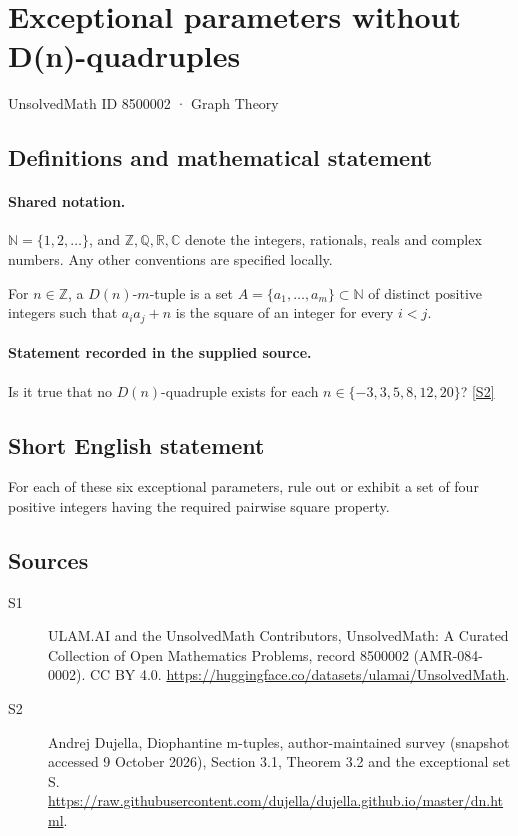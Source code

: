 \documentclass[11pt]{article}
\newcommand{\sref}[2]{\hyperlink{source:#1:#2}{[S#2]}}
\begin{document}
\setcounter{section}{8500001}
\section{Exceptional parameters without D(n)-quadruples}\label{8500002}
{\small\sffamily UnsolvedMath ID 8500002 · Graph Theory}
\subsection{Definitions and mathematical statement}

\paragraph{Shared notation.}$\mathbb N=\{1,2,\ldots\}$, and $\mathbb Z,\mathbb Q,\mathbb R,\mathbb C$ denote the integers, rationals, reals and complex numbers. Any other conventions are specified locally.


For $n\in\mathbb Z$, a $D(n)$-$m$-tuple is a set $A=\{a_1,\ldots,a_m\}\subset\mathbb N$ of distinct positive integers such that $a_i a_j+n$ is the square of an integer for every $i<j$.
\paragraph{Statement recorded in the supplied source.}
Is it true that no $D(n)$-quadruple exists for each $n\in\{-3,3,5,8,12,20\}$? \sref{8500002}{2}
\subsection{Short English statement}
For each of these six exceptional parameters, rule out or exhibit a set of four positive integers having the required pairwise square property.
\subsection{Sources}
\begin{description}
\item[\hypertarget{source:8500002:1}{S1}] ULAM.AI and the UnsolvedMath Contributors, UnsolvedMath: A Curated Collection of Open Mathematics Problems, record 8500002 (AMR-084-0002). CC BY 4.0. \url{https://huggingface.co/datasets/ulamai/UnsolvedMath}.
\item[\hypertarget{source:8500002:2}{S2}] Andrej Dujella, Diophantine m-tuples, author-maintained survey (snapshot accessed 9 October 2026), Section 3.1, Theorem 3.2 and the exceptional set S. \url{https://raw.githubusercontent.com/dujella/dujella.github.io/master/dn.html}.
\end{description}
\label{end:8500002}
\end{document}
